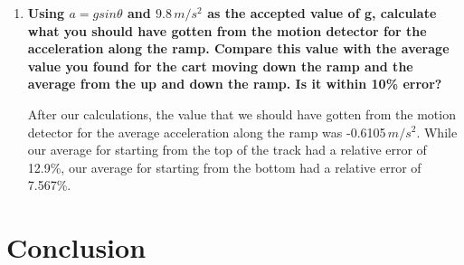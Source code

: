 \documentclass[a4paper,12pt]{article}
\begin{document}
\begin{enumerate}
\item \textbf{Using $a=gsin\theta$ and $9.8\,m/s^2$ as the accepted value of g, calculate what you should have gotten from the motion detector for the acceleration along the ramp. Compare this value with the average value you found for the cart moving down the ramp and the average from the up and down the ramp. Is it within 10\% error?}

	After our calculations, the value that we should have gotten from the motion detector for the average acceleration along the ramp was -0.6105\,$m/s^2$. While our average for starting from the top of the track had a relative error of 12.9\%, our average for starting from the bottom had a relative error of 7.567\%. 
	
\end{enumerate}






\section{Conclusion}

\vspace{-0.5cm}
\singlespacing
\end{document}
